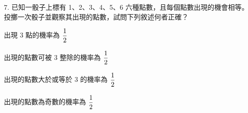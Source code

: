 \documentclass[12pt]{article}
\begin{document}
\begin{problem}
  \item[7.] 已知一骰子上標有 1、2、3、4、5、6 六種點數，且每個點數出現的機會相等。投擲一次骰子並觀察其出現的點數，試問下列敘述何者正確？
  \begin{choices}
    \item 出現 3 點的機率為 $\fraction{1}{2}$
    \item 出現的點數可被 3 整除的機率為 $\fraction{1}{2}$
    \item 出現的點數大於或等於 3 的機率為 $\fraction{1}{2}$
    \item 出現的點數為奇數的機率為 $\fraction{1}{2}$
  \end{choices}
\end{problem}
\end{document}
